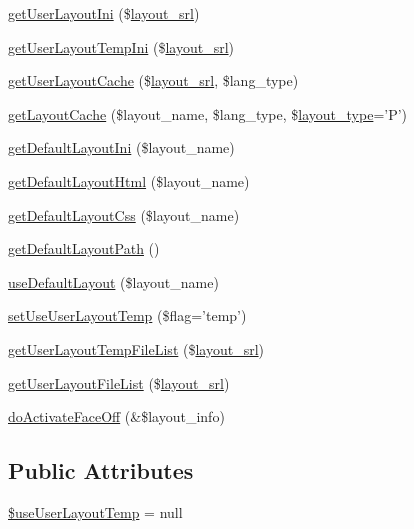 \begin{DoxyCompactItemize}
\item 
\hyperlink{classlayoutModel_ae52b6a4a0f82631f23b6af7603c0a30e}{get\-User\-Layout\-Ini} (\$\hyperlink{ko_8install_8php_a70054876db09b2519a1726663c8dd9e7}{layout\-\_\-srl})
\item 
\hyperlink{classlayoutModel_a0de830b5db7303b6909568dfdfad2ac3}{get\-User\-Layout\-Temp\-Ini} (\$\hyperlink{ko_8install_8php_a70054876db09b2519a1726663c8dd9e7}{layout\-\_\-srl})
\item 
\hyperlink{classlayoutModel_a54bdf5ad29661e7d2e97e4831cf8832c}{get\-User\-Layout\-Cache} (\$\hyperlink{ko_8install_8php_a70054876db09b2519a1726663c8dd9e7}{layout\-\_\-srl}, \$lang\-\_\-type)
\item 
\hyperlink{classlayoutModel_afdd4cdf78d44f0a042522112818ddf11}{get\-Layout\-Cache} (\$layout\-\_\-name, \$lang\-\_\-type, \$\hyperlink{ko_8install_8php_a0532d89570cfdaebc628afac2ff5a81b}{layout\-\_\-type}='P')
\item 
\hyperlink{classlayoutModel_a983d5b4ff865d15ee237385b1c82b5e5}{get\-Default\-Layout\-Ini} (\$layout\-\_\-name)
\item 
\hyperlink{classlayoutModel_a1ec8ba060697878271fc70fbc0ce2867}{get\-Default\-Layout\-Html} (\$layout\-\_\-name)
\item 
\hyperlink{classlayoutModel_a986cf32677527f2efeacb8e5c2bc68e6}{get\-Default\-Layout\-Css} (\$layout\-\_\-name)
\item 
\hyperlink{classlayoutModel_a446c397aaf30fa592cba675f2fbb9495}{get\-Default\-Layout\-Path} ()
\item 
\hyperlink{classlayoutModel_a85dfbba773c086806d4d8c9586d16e52}{use\-Default\-Layout} (\$layout\-\_\-name)
\item 
\hyperlink{classlayoutModel_a513d5dde919e55e29c25889729d087a1}{set\-Use\-User\-Layout\-Temp} (\$flag='temp')
\item 
\hyperlink{classlayoutModel_a64f8b7f26a864b7c64d491a83bbf3961}{get\-User\-Layout\-Temp\-File\-List} (\$\hyperlink{ko_8install_8php_a70054876db09b2519a1726663c8dd9e7}{layout\-\_\-srl})
\item 
\hyperlink{classlayoutModel_a068c761aeebdbc423b005a2e793b1b21}{get\-User\-Layout\-File\-List} (\$\hyperlink{ko_8install_8php_a70054876db09b2519a1726663c8dd9e7}{layout\-\_\-srl})
\item 
\hyperlink{classlayoutModel_a09e314ac34d65617cbfd2f1aa5f097a8}{do\-Activate\-Face\-Off} (\&\$layout\-\_\-info)
\end{DoxyCompactItemize}
\subsection*{Public Attributes}
\begin{DoxyCompactItemize}
\item 
\hyperlink{classlayoutModel_a51f307edec8ca62a4cbaffb4833b2d20}{\$use\-User\-Layout\-Temp} = null
\end{DoxyCompactItemize}


